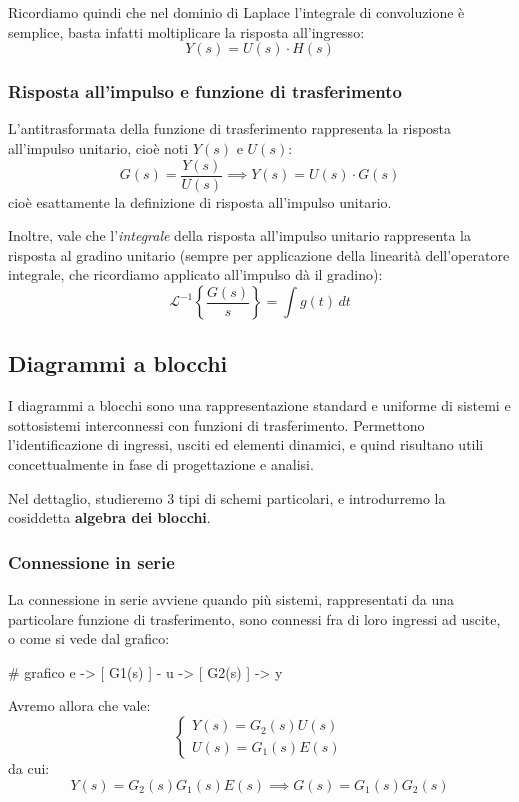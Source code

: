 \documentclass[a4paper,11pt]{article}
\begin{document}
\par\smallskip

Ricordiamo quindi che nel dominio di Laplace l'integrale di convoluzione è semplice, basta infatti moltiplicare la risposta all'ingresso:
$$
Y(s) = U(s) \cdot H(s)
$$

\subsubsection{Risposta all'impulso e funzione di trasferimento}
L'antitrasformata della funzione di trasferimento rappresenta la risposta all'impulso unitario, cioè noti $Y(s)$ e $U(s)$:
$$
G(s) = \frac{Y(s)}{U(s)} \implies Y(s) = U(s) \cdot G(s)
$$
cioè esattamente la definizione di risposta all'impulso unitario.

Inoltre, vale che l'\textit{integrale} della risposta all'impulso unitario rappresenta la risposta al gradino unitario (sempre per applicazione della linearità dell'operatore integrale, che ricordiamo applicato all'impulso dà il gradino):
$$
\mathcal{L}^{-1} \left\{ \frac{G(s)}{s} \right\} = \int g(t) \, dt
$$

\subsection{Diagrammi a blocchi}
I diagrammi a blocchi sono una rappresentazione standard e uniforme di sistemi e sottosistemi interconnessi con funzioni di trasferimento.
Permettono l'identificazione di ingressi, usciti ed elementi dinamici, e quind risultano utili concettualmente in fase di progettazione e analisi.

Nel dettaglio, studieremo 3 tipi di schemi particolari, e introdurremo la cosiddetta \textbf{algebra dei blocchi}.

\subsubsection{Connessione in serie}
La connessione in serie avviene quando più sistemi, rappresentati da una particolare funzione di trasferimento, sono connessi fra di loro ingressi ad uscite, o come si vede dal grafico:

# grafico e -> [ G1(s) ] - u -> [ G2(s) ] -> y

Avremo allora che vale:
\[
	\begin{cases}
	Y(s) = G_2(s) U(s) \\
	U(s) = G_1(s) E(s)
	\end{cases}
\]
da cui:
$$
Y(s) = G_2(s)G_1(s)E(s) \implies G(s) = G_1(s) G_2(s)
$$
\end{document}
